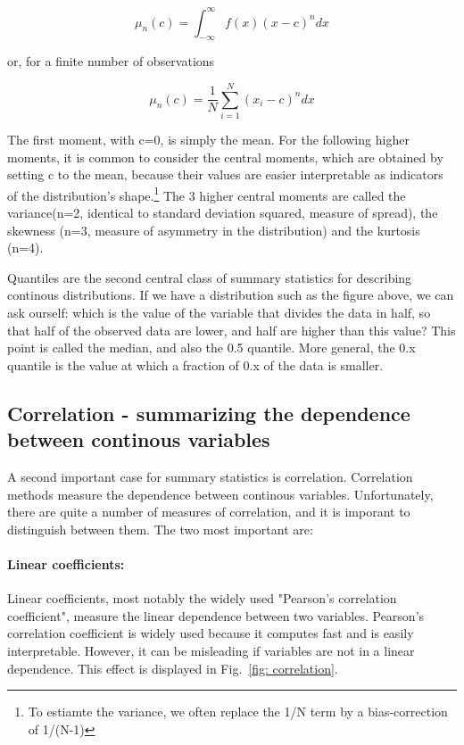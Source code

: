 \documentclass[a4paper,twoside]{tufte-book}\usepackage[]{graphicx}\usepackage[]{color}
\begin{document}
\begin{equation}
\mu_n(c) = \int_{-\infty}^{\infty} f(x) (x - c)^n dx
\end{equation}

or, for a finite number of observations 

\begin{equation}
\mu_n(c) = \frac{1}{N}\sum_{i=1}^N (x_i - c)^n dx
\end{equation}

The first moment, with c=0, is simply the mean. For the following higher moments, it is common to consider the central moments, which are obtained by setting c to the mean, because their values are easier interpretable as indicators of the distribution's shape.\footnote{To estiamte the variance, we often replace the 1/N term by a bias-correction of 1/(N-1)} The 3 higher central moments are called the variance(n=2, identical to standard deviation squared, measure of spread), the skewness (n=3, measure of asymmetry in the distribution) and the kurtosis (n=4). 

Quantiles are the second central class of summary statistics for describing continous distributions. If we have a distribution such as the figure above, we can ask ourself: which is the value of the variable that divides the data in half, so that half of the observed data are lower, and half are higher than this value? This point is called the median, and also the 0.5 quantile. More general, the 0.x quantile is the value at which a fraction of 0.x of the data is smaller. 

\subsection{Correlation - summarizing the dependence between continous variables}

A second important case for summary statistics is correlation. Correlation methods measure the dependence between continous variables. Unfortunately, there are quite a number of measures of correlation, and it is imporant to distinguish between them. The two most important are:

\paragraph{Linear coefficients:}Linear coefficients, most notably the widely used "Pearson's correlation coefficient", measure the linear dependence between two variables. Pearson's correlation coefficient is widely used because it computes fast and is easily interpretable. However, it can be misleading if variables are not in a linear dependence. This effect is displayed in Fig.~\ref{fig: correlation}.
\end{document}
